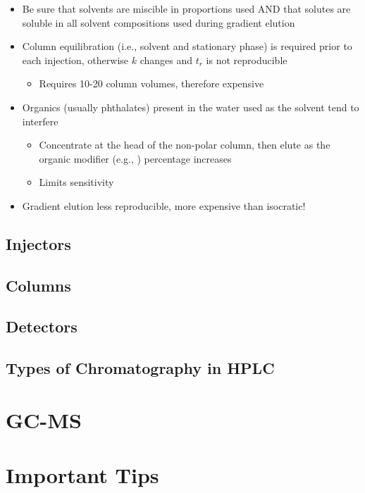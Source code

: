 \documentclass[a4paper, 12pt]{article}
\begin{document}
\begin{itemize}
	\item Be sure that solvents are miscible in proportions used AND that solutes are soluble in all solvent compositions used during gradient elution
	\item Column equilibration (i.e., solvent and stationary phase) is required prior to each injection, otherwise $k$ changes and $t_r$ is not reproducible
	\begin{itemize}
		\item Requires 10-20 column volumes, therefore expensive
	\end{itemize}
		\item Organics (usually phthalates) present in the water used as the solvent tend to interfere
	\begin{itemize}
		\item Concentrate at the head of the non-polar column, then elute as the organic modifier (e.g., ) percentage increases
		\item Limits sensitivity
	\end{itemize}
	\item Gradient elution less reproducible, more expensive than isocratic!
\end{itemize}


\subsection{Injectors}


\subsection{Columns}


\subsection{Detectors}


\subsection{Types of Chromatography in HPLC}


\section{GC-MS}


\section{Important Tips}
\end{document}
